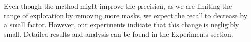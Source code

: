 Even though the method might improve the precision, as we are limiting the range of exploration by removing more masks, we expect the recall to decrease by a small factor. However, our experiments indicate that this change is negligibly small. Detailed results and analysis can be found in the Experiments section.

